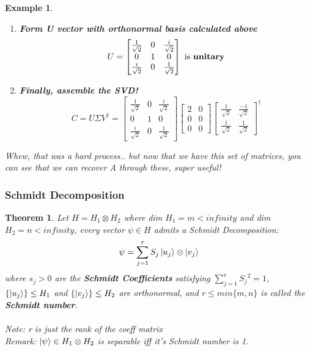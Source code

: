 \documentclass[12pt]{article}
\theoremstyle{plain}
\newtheorem{theorem}[lemma]{Theorem}
\theoremstyle{nonumberplain}
\theoremstyle{plain}
\newtheorem{example}[lemma]{Example}
\theoremstyle{nonumberplain}
\newcommand\1{{\bf 1}}
\newcommand{\bmat}[1]{\begin{bmatrix*} #1 \end{bmatrix*}} %
\newcommand{\<}{\left\langle}
\renewcommand{\>}{\right\rangle}
\begin{document}
\begin{example}
\begin{enumerate}
\begin{align*}
\ket{u_1} &= \bmat{\frac{1}{\sqrt{2}}\\ 0\\ \frac{i}{\sqrt{2}}}\\
\ket{u_2} &= \bmat{0\\ 1\\ 0}\\
\ket{u_3} &= \bmat{\frac{i}{\sqrt{2}}\\ 0\\ \frac{1}{\sqrt{2}}}
\end{align*}

\item \textbf{Form U vector with orthonormal basis calculated above}
\begin{equation}
U = \bmat{\frac{1}{\sqrt{2}} &0 &\frac{i}{\sqrt{2}}\\ 0 &1 &0\\ \frac{i}{\sqrt{2}} &0 &\frac{1}{\sqrt{2}}} \text{ is \textbf{unitary}}
\end{equation}

\item \textbf{Finally, assemble the SVD!}
\begin{equation}
C =  U \Sigma V^\dagger = \bmat{\frac{1}{\sqrt{2}} &0 &\frac{i}{\sqrt{2}}\\ 0 &1 &0\\ \frac{i}{\sqrt{2}} &0 &\frac{1}{\sqrt{2}}}\bmat{2&0\\0&0\\0&0}{\bmat{\frac{1}{\sqrt{2}} &\frac{-1}{\sqrt{2}}\\ \frac{1}{\sqrt{2}} &\frac{1}{\sqrt{2}}}}^\dagger
\end{equation}
\end{enumerate}
Whew, that was a hard process.. but now that we have this set of matrices, you can see that we can recover A through these, super useful!
\end{example}

\subsubsection{Schmidt Decomposition}

\begin{theorem} Let $H = H_1 \otimes H_2$ where dim $H_1 = m < infinity$ and dim $H_2 = n < infinity$, every vector $\psi \in H$ admits a Schmidt Decomposition:
\begin{equation}
\psi = \sum_{j = 1}^r S_j \ket{u_j} \otimes \ket{v_j}
\end{equation}
where $s_j > 0$ are the \textbf{Schmidt Coefficients} satisfying $\sum_{j = 1}^r {S_j}^2 = 1$, $\{\ket{u_j}\} \leq H_1$ and $\{\ket{v_j}\} \leq H_2$ are orthonormal, and $r \leq min\{m,n\}$ is called the \textbf{Schmidt number}.\\
\\
\textit{Note: r is just the rank of the coeff matrix}\\
\textit{Remark: $\ket{\psi} \in H_1 \otimes H_2$ is separable iff it's Schmidt number is 1}. 
\end{theorem}
\end{document}
